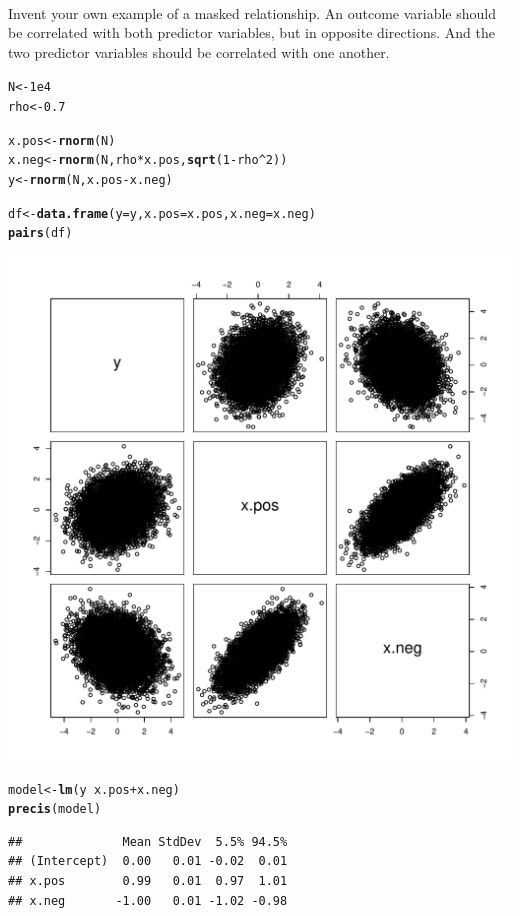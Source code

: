 \documentclass[12pt]{article}\usepackage[]{graphicx}\usepackage[]{color}
\makeatletter
\def\maxwidth{ %
  \ifdim\Gin@nat@width>\linewidth
    \linewidth
  \else
    \Gin@nat@width
  \fi
}
\newcommand{\hlnum}[1]{\textcolor[rgb]{0.686,0.059,0.569}{#1}}%
\newcommand{\hlopt}[1]{\textcolor[rgb]{0,0,0}{#1}}%
\newcommand{\hlstd}[1]{\textcolor[rgb]{0.345,0.345,0.345}{#1}}%
\newcommand{\hlkwb}[1]{\textcolor[rgb]{0.69,0.353,0.396}{#1}}%
\newcommand{\hlkwc}[1]{\textcolor[rgb]{0.333,0.667,0.333}{#1}}%
\newcommand{\hlkwd}[1]{\textcolor[rgb]{0.737,0.353,0.396}{\textbf{#1}}}%
\newenvironment{kframe}{%
 \def\at@end@of@kframe{}%
 \ifinner\ifhmode%
  \def\at@end@of@kframe{\end{minipage}}%
  \begin{minipage}{\columnwidth}%
 \fi\fi%
 \def\FrameCommand##1{\hskip\@totalleftmargin \hskip-\fboxsep
 \colorbox{shadecolor}{##1}\hskip-\fboxsep
     \hskip-\linewidth \hskip-\@totalleftmargin \hskip\columnwidth}%
 \MakeFramed {\advance\hsize-\width
   \@totalleftmargin\z@ \linewidth\hsize
   \@setminipage}}%
 {\par\unskip\endMakeFramed%
 \at@end@of@kframe}
\newenvironment{knitrout}{}{} %
\newenvironment{problem}[2][Problem]{\begin{trivlist}
\item[\hskip \labelsep {\bfseries #1}\hskip \labelsep {\bfseries #2.}]}{\end{trivlist}}
\makeatother
\begin{document}
\begin{problem}{5M2}
\text{ }\\
Invent your own example of a masked relationship. An outcome variable should be correlated with both predictor variables, but in opposite directions. And the two predictor variables should be correlated with one another.
\end{problem}

\begin{knitrout}
\color{fgcolor}\begin{kframe}
\begin{alltt}
\hlstd{N} \hlkwb{<-} \hlnum{1e4}
\hlstd{rho} \hlkwb{<-} \hlnum{0.7}

\hlstd{x.pos} \hlkwb{<-} \hlkwd{rnorm}\hlstd{(N)}
\hlstd{x.neg} \hlkwb{<-} \hlkwd{rnorm}\hlstd{(N, rho}\hlopt{*}\hlstd{x.pos,} \hlkwd{sqrt}\hlstd{(}\hlnum{1}\hlopt{-}\hlstd{rho}\hlopt{^}\hlnum{2}\hlstd{))}
\hlstd{y} \hlkwb{<-} \hlkwd{rnorm}\hlstd{(N, x.pos} \hlopt{-} \hlstd{x.neg)}

\hlstd{df} \hlkwb{<-} \hlkwd{data.frame}\hlstd{(}\hlkwc{y} \hlstd{= y,} \hlkwc{x.pos} \hlstd{= x.pos,} \hlkwc{x.neg} \hlstd{= x.neg)}
\hlkwd{pairs}\hlstd{(df)}
\end{alltt}
\end{kframe}
\includegraphics[width=\maxwidth]{figure/unnamed-chunk-3-1} 
\begin{kframe}\begin{alltt}
\hlstd{model} \hlkwb{<-} \hlkwd{lm}\hlstd{(y} \hlopt{~} \hlstd{x.pos} \hlopt{+} \hlstd{x.neg)}
\hlkwd{precis}\hlstd{(model)}
\end{alltt}
\begin{verbatim}
##              Mean StdDev  5.5% 94.5%
## (Intercept)  0.00   0.01 -0.02  0.01
## x.pos        0.99   0.01  0.97  1.01
## x.neg       -1.00   0.01 -1.02 -0.98
\end{verbatim}
\end{kframe}
\end{knitrout}
\end{document}
